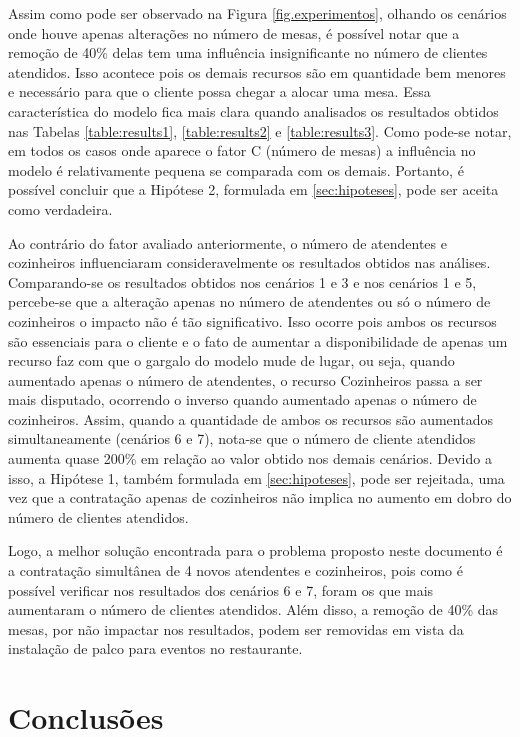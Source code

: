 \documentclass[pt,disc,oneside]{ufscpgeasthesis}
\begin{document}
			Assim como pode ser observado na Figura \ref{fig.experimentos}, olhando os cenários onde houve apenas alterações no número de mesas, é possível notar que a remoção de 40\% delas tem uma influência insignificante no número de clientes atendidos.
			Isso acontece pois os demais recursos são em quantidade bem menores e necessário para que o cliente possa chegar a alocar uma mesa.
			Essa característica do modelo fica mais clara quando analisados os resultados obtidos nas Tabelas \ref{table:results1}, \ref{table:results2} e \ref{table:results3}.
			Como pode-se notar, em todos os casos onde aparece o fator C (número de mesas) a influência no modelo é relativamente pequena se comparada com os demais.
			Portanto, é possível concluir que a Hipótese 2, formulada em \ref{sec:hipoteses}, pode ser aceita como verdadeira.

			Ao contrário do fator avaliado anteriormente, o número de atendentes e cozinheiros influenciaram consideravelmente os resultados obtidos nas análises.
			Comparando-se os resultados obtidos nos cenários 1 e 3 e nos cenários 1 e 5, percebe-se que a alteração apenas no número de atendentes ou só o número de cozinheiros o impacto não é tão significativo.
			Isso ocorre pois ambos os recursos são essenciais para o cliente e o fato de aumentar a disponibilidade de apenas um recurso faz com que o gargalo do modelo mude de lugar, ou seja, quando aumentado apenas o número de atendentes, o recurso Cozinheiros passa a ser mais disputado, ocorrendo o inverso quando aumentado apenas o número de cozinheiros.
			Assim, quando a quantidade de ambos os recursos são aumentados simultaneamente (cenários 6 e 7), nota-se que o número de cliente atendidos aumenta quase 200\% em relação ao valor obtido nos demais cenários.
			Devido a isso, a Hipótese 1, também formulada em \ref{sec:hipoteses}, pode ser rejeitada, uma vez que a contratação apenas de cozinheiros não implica no aumento em dobro do número de clientes atendidos.

			Logo, a melhor solução encontrada para o problema proposto neste documento é a contratação simultânea de 4 novos atendentes e cozinheiros, pois como é possível verificar nos resultados dos cenários 6 e 7, foram os que mais aumentaram o número de clientes atendidos.
			Além disso, a remoção de 40\% das mesas, por não impactar nos resultados, podem ser removidas em vista da instalação de palco para eventos no restaurante.

	\chapter{Conclusões}
	\label{cap:conclusoes}
\end{document}

